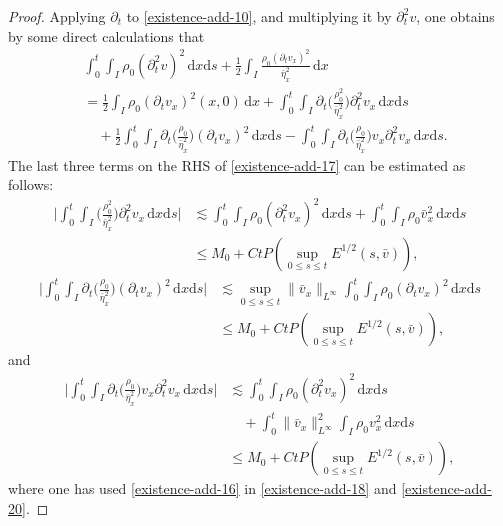 \documentclass[11pt, reqno]{amsart}
\newcommand{\diff}{\mathrm{d}}
\numberwithin{equation}{section}
\begin{document}
{\begin{proof}
\bigskip
{} Applying \(\partial_t\) to \eqref{existence-add-10}, 
and multiplying it by \(\partial_t^2v\), one obtains by some direct calculations that
\begin{equation}\label{existence-add-17}
\begin{aligned}
&\int_0^t\int_I \rho_0(\partial_t^2v)^2\,\diff x\diff s
+\frac{1}{2}\int_I\frac{\rho_0(\partial_tv_x)^2}{\bar{\eta}_x^2}\,\diff x\\
&=\frac{1}{2}\int_I\rho_0(\partial_tv_x)^2(x,0)\,\diff x+\int_0^t\int_I\partial_t\bigg({\frac{\rho_0^2}{\bar{\eta}_x^2}}\bigg)\partial_t^2v_x\,\diff x\diff s\\
&\quad+\frac{1}{2}\int_0^t\int_I\partial_t\bigg({\frac{\rho_0}{\bar{\eta}_x^2}}\bigg)(\partial_tv_x)^2\,\diff x\diff s
-\int_0^t\int_I\partial_t\bigg({\frac{\rho_0}{\bar{\eta}_x^2}}\bigg)v_x\partial_t^2v_x\,\diff x\diff s.
\end{aligned}
\end{equation}
The last three terms on the RHS of \eqref{existence-add-17} can be estimated as follows:
\begin{equation}\label{existence-add-18}
\begin{aligned}
\bigg|\int_0^t\int_I\bigg({\frac{\rho_0^2}{\bar{\eta}_x^2}}\bigg)\partial_t^2v_x\,\diff x\diff s\bigg|
&\lesssim \int_0^t\int_I\rho_0(\partial_t^2v_x)^2\,\diff x\diff s+\int_0^t\int_I\rho_0\bar{v}_x^2\,\diff x\diff s\\
&\leq M_0+Ct P(\sup_{0\leq s\leq t}E^{1/2}(s,\bar{v})),
\end{aligned}
\end{equation}
\begin{equation}\label{existence-add-19}
\begin{aligned}
\bigg|\int_0^t\int_I\partial_t\bigg({\frac{\rho_0}{\bar{\eta}_x^2}}\bigg)(\partial_tv_x)^2\,\diff x\diff s\bigg|
&\lesssim \sup_{0\leq s\leq t}\|\bar{v}_x\|_{L^\infty}\int_0^t\int_I\rho_0(\partial_tv_x)^2\,\diff x\diff s\\
&\leq M_0+Ct P(\sup_{0\leq s\leq t}E^{1/2}(s,\bar{v})),
\end{aligned}
\end{equation}
and
\begin{equation}\label{existence-add-20}
\begin{aligned}
\bigg|\int_0^t\int_I\partial_t\bigg({\frac{\rho_0}{\bar{\eta}_x^2}}\bigg)v_x\partial_t^2v_x\,\diff x\diff s\bigg|&\lesssim \int_0^t\int_I\rho_0(\partial_t^2v_x)^2\,\diff x\diff s\\
&\quad+\int_0^t\|\bar{v}_x\|_{L^\infty}^2\int_I\rho_0v_x^2\,\diff x\diff s\\
&\leq M_0+Ct P(\sup_{0\leq s\leq t}E^{1/2}(s,\bar{v})),
\end{aligned}
\end{equation}
where one has used \eqref{existence-add-16} in \eqref{existence-add-18} and \eqref{existence-add-20}. 


\end{proof}}
\end{document}
